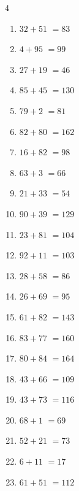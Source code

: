 \begin{multicols}{4}
\begin{enumerate}
  \item $32+51$
        $=83$

  \item $4+95$
        $=99$

  \item $27+19$
        $=46$

  \item $85+45$
        $=130$

  \item $79+2$
        $=81$

  \item $82+80$
        $=162$

  \item $16+82$
        $=98$

  \item $63+3$
        $=66$

  \item $21+33$
        $=54$

  \item $90+39$
        $=129$

  \item $23+81$
        $=104$

  \item $92+11$
        $=103$

  \item $28+58$
        $=86$

  \item $26+69$
        $=95$

  \item $61+82$
        $=143$

  \item $83+77$
        $=160$

  \item $80+84$
        $=164$

  \item $43+66$
        $=109$

  \item $43+73$
        $=116$

  \item $68+1$
        $=69$

  \item $52+21$
        $=73$

  \item $6+11$
        $=17$

\columnbreak %

  \item $61+51$
        $=112$


\end{enumerate}
\end{multicols}
